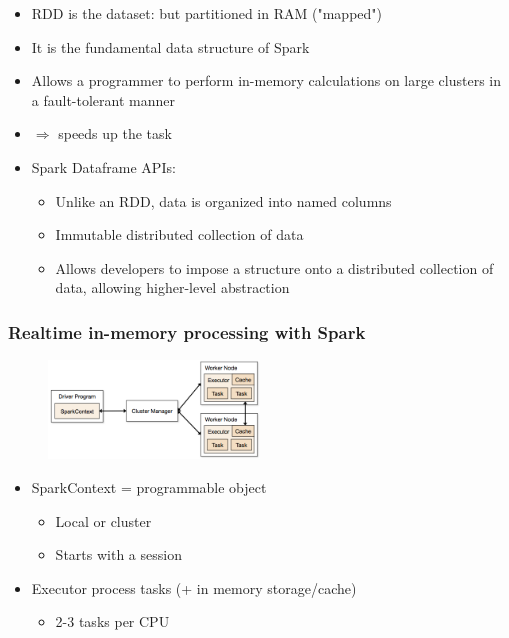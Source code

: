 \documentclass{article}
\begin{document}
\begin{itemize}
    \item RDD is the dataset: but partitioned in RAM ("mapped")
    \item It is the fundamental data structure of Spark
    \item Allows a programmer to perform in-memory calculations on large clusters in a fault-tolerant manner
    \item $\Rightarrow$ speeds up the task
    \item Spark Dataframe APIs:
    \begin{itemize}
        \item Unlike an RDD, data is organized into named columns
        \item Immutable distributed collection of data
        \item Allows developers to impose a structure onto a distributed collection of data, allowing higher-level abstraction
    \end{itemize}
\end{itemize}

\subsubsection{Realtime in-memory processing with Spark}

\begin{figure}[H]
    \centering
    \includegraphics[width=0.5\textwidth]{spark-realtime-inmemory-processing.png}
    \caption{}
\end{figure}

\begin{itemize}
    \item SparkContext = programmable object
    \begin{itemize}
        \item Local or cluster
        \item Starts with a session
    \end{itemize}
    \item Executor process tasks (+ in memory storage/cache)
    \begin{itemize}
        \item 2-3 tasks per CPU
    \end{itemize}
\end{itemize}
\end{document}

